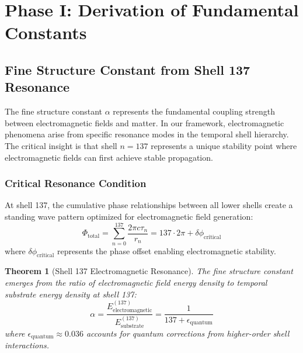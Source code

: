 \documentclass[12pt,a4paper]{article}
\theoremstyle{plain}
\newtheorem{theorem}{Theorem}[section]
\theoremstyle{definition}
\begin{document}
\section{Phase I: Derivation of Fundamental Constants}

\subsection{Fine Structure Constant from Shell 137 Resonance}

The fine structure constant $\alpha$ represents the fundamental coupling strength between electromagnetic fields and matter. In our framework, electromagnetic phenomena arise from specific resonance modes in the temporal shell hierarchy. The critical insight is that shell $n=137$ represents a unique stability point where electromagnetic fields can first achieve stable propagation.

\subsubsection{Critical Resonance Condition}

At shell 137, the cumulative phase relationships between all lower shells create a standing wave pattern optimized for electromagnetic field generation:
\begin{equation}
\Phi_{\text{total}} = \sum_{n=0}^{137} \frac{2\pi c \tau_n}{r_n} = 137 \cdot 2\pi + \delta\phi_{\text{critical}}
\end{equation}
where $\delta\phi_{\text{critical}}$ represents the phase offset enabling electromagnetic stability.

\begin{theorem}[Shell 137 Electromagnetic Resonance]
The fine structure constant emerges from the ratio of electromagnetic field energy density to temporal substrate energy density at shell 137:
\begin{equation}
\alpha = \frac{E_{\text{electromagnetic}}^{(137)}}{E_{\text{substrate}}^{(137)}} = \frac{1}{137 + \epsilon_{\text{quantum}}}
\end{equation}
where $\epsilon_{\text{quantum}} \approx 0.036$ accounts for quantum corrections from higher-order shell interactions.
\end{theorem}
\end{document}
